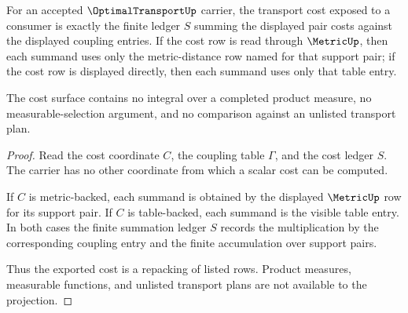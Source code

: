 \begin{theorem}
\label{thm:optimaltransport-cost-summation-ledger}
For an accepted $\OptimalTransportUp$ carrier, the transport cost exposed to a consumer is exactly the finite ledger $S$ summing the displayed pair costs against the displayed coupling entries. If the cost row is read through $\MetricUp$, then each summand uses only the metric-distance row named for that support pair; if the cost row is displayed directly, then each summand uses only that table entry.

The cost surface contains no integral over a completed product measure, no measurable-selection argument, and no comparison against an unlisted transport plan.
\end{theorem}
\begin{proof}
Read the cost coordinate $C$, the coupling table $\Gamma$, and the cost ledger $S$. The carrier has no other coordinate from which a scalar cost can be computed.

If $C$ is metric-backed, each summand is obtained by the displayed $\MetricUp$ row for its support pair. If $C$ is table-backed, each summand is the visible table entry. In both cases the finite summation ledger $S$ records the multiplication by the corresponding coupling entry and the finite accumulation over support pairs.

Thus the exported cost is a repacking of listed rows. Product measures, measurable functions, and unlisted transport plans are not available to the projection.
\end{proof}

